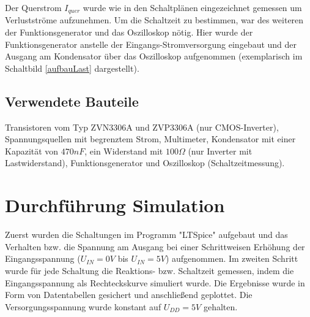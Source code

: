 \documentclass[11pt, a4paper]{article}
\begin{document}
Der Querstrom $I_{quer}$ wurde wie in den Schaltplänen eingezeichnet gemessen um Verlustströme aufzunehmen.
Um die Schaltzeit zu bestimmen, war des weiteren der Funktionsgenerator und das Oszilloskop nötig. Hier wurde der Funktionsgenerator anstelle der Eingangs-Stromversorgung eingebaut und der Ausgang am Kondensator über das Oszilloskop aufgenommen (exemplarisch im Schaltbild \autoref{aufbauLast} dargestellt).
\subsection*{Verwendete Bauteile}
Transistoren vom Typ ZVN3306A und ZVP3306A (nur CMOS-Inverter), Spannungsquellen mit begrenztem Strom, Multimeter, Kondensator mit einer Kapazität von $470 nF$, ein Widerstand mit $100 \Omega$ (nur Inverter mit Lastwiderstand), Funktionsgenerator und Oszilloskop (Schaltzeitmessung).
\section*{Durchführung Simulation}
Zuerst wurden die Schaltungen im Programm "LTSpice" aufgebaut und das Verhalten bzw. die Spannung am Ausgang bei einer Schrittweisen Erhöhung der Eingangsspannung ($U_{IN} = 0 V$ bis $U_{IN} = 5 V$) aufgenommen. Im zweiten Schritt wurde für jede Schaltung die Reaktions- bzw. Schaltzeit gemessen, indem die Eingangsspannung als Rechteckskurve simuliert wurde.
Die Ergebnisse wurde in Form von Datentabellen gesichert und anschließend geplottet. Die Versorgungsspannung wurde konstant auf $U_{DD} = 5 V$ gehalten.
\end{document}
